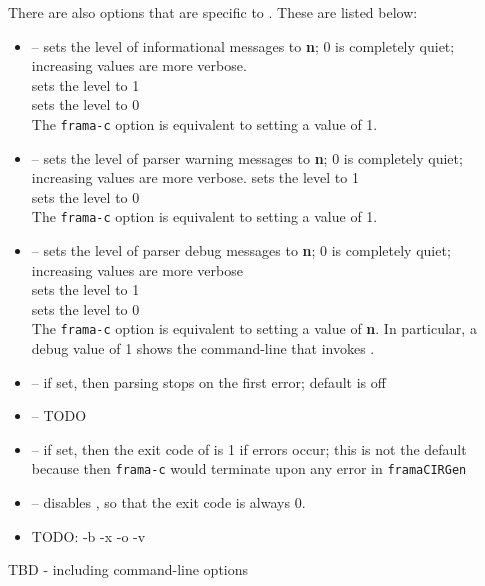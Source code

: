 There are also options that are specific to \fcl.
These are listed below:
\begin{itemize}
	\item {} -- sets the level of informational messages to \textbf{n}; 0 is completely quiet; increasing values are
	more verbose. \\
	 sets the level to 1 \\
	 sets the level to 0\\
	 The \lstinline|frama-c| option  is equivalent to setting a value of 1.
	
	\item {} -- sets the level of parser warning messages to \textbf{n}; 0 is completely quiet; increasing values are
more verbose.  sets the level to 1\\
 sets the level to 0\\
The \lstinline|frama-c| option  is equivalent to setting a value of 1.

	\item {} -- sets the level of parser debug messages to \textbf{n}; 0 is completely quiet; increasing values are
more verbose\\
  sets the level to 1\\
 sets the level to 0\\
The \lstinline|frama-c| option  is equivalent to setting a value of \textbf{n}.
In particular, a debug value of 1 shows the command-line that invokes \irg.

	\item {} -- if set, then parsing stops on the first error; default is off
	\item {} -- TODO
	\item {} -- if set, then the exit code of \irg is 1 if errors occur; this is not the default because then \lstinline|frama-c| would terminate upon
	any error in \lstinline|framaCIRGen|
	\item {} -- disables , so that the exit code is always 0.

\item TODO: -b -x -o -v
	
\end{itemize}


TBD - including command-line options

